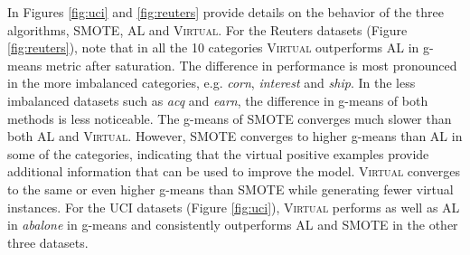 In Figures \ref{fig:uci} and \ref{fig:reuters} provide details on the behavior of the three algorithms, SMOTE, AL and \textsc{Virtual}. For the Reuters datasets (Figure \ref{fig:reuters}), note that in all the 10 categories \textsc{Virtual} outperforms AL in g-means metric after saturation. The difference in performance is most pronounced in the more imbalanced categories, e.g. \emph{corn}, \emph{interest} and \emph{ship}. In the less imbalanced datasets such as \emph{acq} and \emph{earn}, the difference in g-means of both methods is less noticeable. The g-means of SMOTE converges much slower than both AL and \textsc{Virtual}. However, SMOTE converges to higher g-means than AL in some of the categories, indicating that the virtual positive examples provide additional information that can be used to improve the model. \textsc{Virtual} converges to the same or even higher g-means than SMOTE while generating fewer virtual instances. For the UCI datasets (Figure \ref{fig:uci}), \textsc{Virtual} performs as well as AL in \emph{abalone} in g-means and consistently outperforms AL and SMOTE in the other three datasets.

